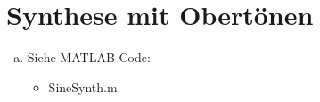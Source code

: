 \chapter{Synthese mit Obertönen}


\begin{enumerate}[a)]
\item
Siehe MATLAB-Code:
\begin{itemize}
\item
SineSynth.m
\end{itemize}
\end{enumerate}
